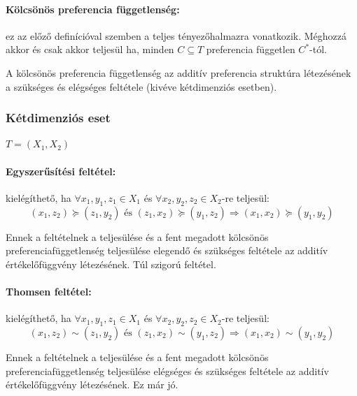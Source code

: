\documentclass[a4paper,12pt]{article}
\begin{document}
\paragraph{Kölcsönös preferencia függetlenség: } ez az előző definícióval szemben a teljes tényezőhalmazra vonatkozik. Méghozzá akkor és csak akkor teljesül ha, minden $C \subseteq T$ preferencia független $C^*$-tól.

A kölcsönös preferencia függetlenség az additív preferencia struktúra létezésének a szükséges és elégséges feltétele (kivéve kétdimenziós esetben).

\subsubsection{Kétdimenziós eset}

$T=(X_1,X_2)$

\paragraph{Egyszerűsítési feltétel: } kielégíthető, ha $\forall x_1, y_1, z_1 \in X_1$ és $\forall x_2, y_2, z_2 \in X_2$-re teljesül: 
\begin{equation}
(x_1, z_2) \succeq (z_1, y_2) \text{ és } (z_1, x_2) \succeq (y_1, z_2)  
\Rightarrow
(x_1, x_2) \succeq (y_1, y_2)
\end{equation} 

Ennek a feltételnek a teljesülése és a fent megadott kölcsönös preferenciafüggetlenség teljesülése elegendő és szükséges feltétele az additív értékelőfüggvény létezésének. Túl szigorú feltétel.

\paragraph{Thomsen feltétel:} kielégíthető, ha $\forall x_1, y_1, z_1 \in X_1$ és $\forall x_2, y_2, z_2 \in X_2$-re teljesül: 
\begin{equation}
(x_1, z_2) \sim (z_1, y_2) \text{ és } (z_1, x_2) \sim (y_1, z_2)  
\Rightarrow
(x_1, x_2) \sim (y_1, y_2)
\end{equation} 

Ennek a feltételnek a teljesülése és a fent megadott kölcsönös preferenciafüggetlenség teljesülése elégséges és szükséges feltétele az additív értékelőfüggvény létezésének. Ez már jó.
\end{document}
